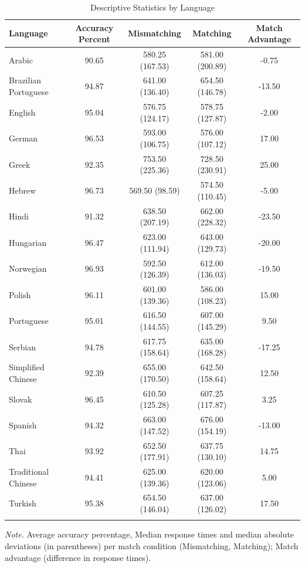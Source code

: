 \documentclass[
  man,floatsintext]{apa7}
\begin{document}
\begin{table}[tbp]

\begin{center}
\begin{threeparttable}

\caption{\label{tab:summary-languages}Descriptive Statistics by Language}

\begin{tabular}{lcccc}
\toprule
Language & Accuracy Percent & Mismatching & Matching & Match Advantage\\
\midrule
Arabic & 90.65 & 580.25 (167.53) & 581.00 (200.89) & -0.75\\
Brazilian Portuguese & 94.87 & 641.00 (136.40) & 654.50 (146.78) & -13.50\\
English & 95.04 & 576.75 (124.17) & 578.75 (127.87) & -2.00\\
German & 96.53 & 593.00 (106.75) & 576.00 (107.12) & 17.00\\
Greek & 92.35 & 753.50 (225.36) & 728.50 (230.91) & 25.00\\
Hebrew & 96.73 & 569.50 (98.59) & 574.50 (110.45) & -5.00\\
Hindi & 91.32 & 638.50 (207.19) & 662.00 (228.32) & -23.50\\
Hungarian & 96.47 & 623.00 (111.94) & 643.00 (129.73) & -20.00\\
Norwegian & 96.93 & 592.50 (126.39) & 612.00 (136.03) & -19.50\\
Polish & 96.11 & 601.00 (139.36) & 586.00 (108.23) & 15.00\\
Portuguese & 95.01 & 616.50 (144.55) & 607.00 (145.29) & 9.50\\
Serbian & 94.78 & 617.75 (158.64) & 635.00 (168.28) & -17.25\\
Simplified Chinese & 92.39 & 655.00 (170.50) & 642.50 (158.64) & 12.50\\
Slovak & 96.45 & 610.50 (125.28) & 607.25 (117.87) & 3.25\\
Spanish & 94.32 & 663.00 (147.52) & 676.00 (154.19) & -13.00\\
Thai & 93.92 & 652.50 (177.91) & 637.75 (130.10) & 14.75\\
Traditional Chinese & 94.41 & 625.00 (139.36) & 620.00 (123.06) & 5.00\\
Turkish & 95.38 & 654.50 (146.04) & 637.00 (126.02) & 17.50\\
\bottomrule
\addlinespace
\end{tabular}

\begin{tablenotes}[para]
\normalsize{\textit{Note.} Average accuracy percentage, Median response times and median absolute deviations (in parentheses) per match condition (Mismatching, Matching); Match advantage (difference in response times).}
\end{tablenotes}

\end{threeparttable}
\end{center}

\end{table}
\end{document}

